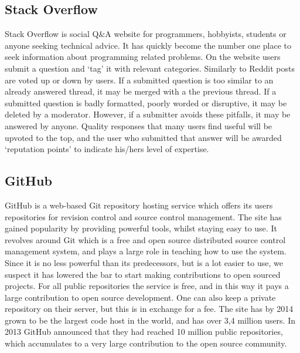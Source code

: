\documentclass[a4paper,11pt]{article} %
\begin{document}
\subsection{Stack Overflow}

Stack Overflow is social Q\&A website for programmers, hobbyists, students or anyone
seeking technical advice. It has quickly become the number one
place to seek information about programming related problems. On the website
users submit a question and ‘tag' it with relevant categories.  Similarly
to Reddit posts are voted up or down by users. If a submitted question is
too similar to an already answered thread, it may be merged with a the
previous thread. If a submitted question is badly formatted, poorly worded
or disruptive, it may be deleted by a moderator.  However, if a submitter
avoids these pitfalls, it may be answered by anyone. Quality responses that
many users find useful will be upvoted to the top, and the user who
submitted that answer will be awarded ‘reputation points’ to indicate his/hers
level of expertise.


\subsection{GitHub}

GitHub is a web-based Git repository hosting service which offers its users
repositories for revision control and source control management. The site
has gained popularity by providing powerful tools, whilst staying easy to
use. It revolves around Git which is a free and open source distributed
source control management system, and plays a large role in teaching how to
use the system. Since it is no less powerful than its predecessors, but is a
lot easier to use, we suspect it has lowered the bar to start making
contributions to open sourced projects. For all public repositories the
service is free, and in this way it pays a large contribution to open source
development. One can also keep a private repository on their server, but
this is in exchange for a fee. The site has by 2014 grown to be the largest
code host in the world, and has over 3,4 million users. In 2013 GitHub
announced that they had reached 10 million public repositories, which
accumulates to a very large contribution to the open source community.
\end{document}

